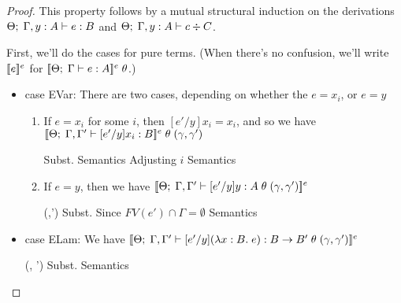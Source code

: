 \begin{proof}
This property follows by a mutual structural induction on the derivations 
${\Theta};\;{\Gamma, y:A} \vdash {e} : {B}$ and ${\Theta};\;{\Gamma, y:A} \vdash {c} \div {C}$. 

First, we'll do the cases for pure terms. (When there's no confusion,
we'll write $[\![{e}]\!]^e$ for
$[\![{{\Theta};\;{\Gamma} \vdash {e} : {A}}]\!]^e\;\theta$.)

\begin{itemize}
\item case EVar: 
  There are two cases, depending on whether the $e = x_i$, or $e = y$

  \begin{enumerate}
  \item If $e = x_i$ for some $i$, then $[e'/y]x_i = x_i$, and so we have
   $[\![{{\Theta};\;{\Gamma, \Gamma'} \vdash {[e'/y]x_i} : {B}}]\!]^e\;\theta\;(\gamma, \gamma')$

    \begin{eqnproof}
            { Subst.}
            { Semantics}
            { Adjusting $i$ }
            { Semantics}
    \end{eqnproof}

  \item If $e = y$, then we have $[\![{{\Theta};\;{\Gamma, \Gamma'} \vdash {[e'/y]y} : {A}\;\theta\;(\gamma, \gamma')}]\!]^e$

    \begin{eqnproof}
      \eline
            {\;\theta\;(\gamma,\gamma')}
            { Subst. }
            { Since $FV(e') \cap \Gamma = \emptyset$}
            { Semantics}
    \end{eqnproof}
  \end{enumerate}

\item case ELam: We have $[\![{{\Theta};\;{\Gamma, \Gamma'} \vdash {[e'/y](\lambda x:B.\;e)} : {B \to B'}\;\theta\;(\gamma, \gamma')}]\!]^e$

  \begin{eqnproof}
    \eline
          {\;\theta\;(\gamma, \gamma')}
          {Subst.}
          {Semantics}


\end{eqnproof}
\end{itemize}
\end{proof}
